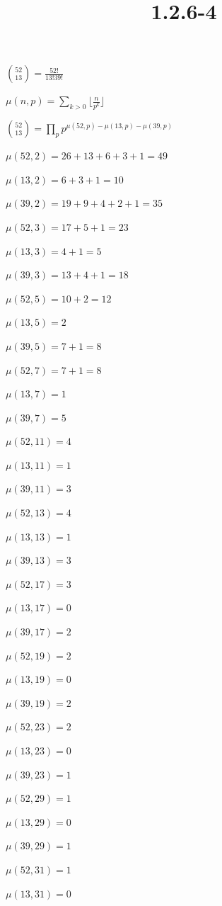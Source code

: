 \documentclass{article}
\title{1.2.6-4}
\begin{document}
\maketitle

\( \binom{52}{13} = \frac{52!}{13! 39!} \)

\( \mu(n,p) = \sum_{k > 0}{\lfloor{\frac{n}{p^k}}\rfloor} \)

\( \binom{52}{13} = \prod_p p^{\mu(52,p) - \mu(13,p) - \mu(39,p)} \)

\( \mu(52,2) = 26 + 13 + 6 + 3 + 1 = 49 \)

\( \mu(13,2) = 6 + 3 + 1 = 10 \)

\( \mu(39,2) = 19 + 9 + 4 + 2 + 1 = 35 \)

\( \mu(52,3) = 17 + 5 + 1 = 23 \)

\( \mu(13,3) = 4 + 1 = 5 \)

\( \mu(39,3) = 13 + 4 + 1 = 18 \)

\( \mu(52,5) = 10 + 2 = 12 \)

\( \mu(13,5) = 2 \)

\( \mu(39,5) = 7 + 1 = 8 \)

\( \mu(52,7) = 7 + 1 = 8 \)

\( \mu(13,7) = 1 \)

\( \mu(39,7) = 5 \)

\( \mu(52,11) = 4 \)

\( \mu(13,11) = 1 \)

\( \mu(39,11) = 3 \)

\( \mu(52,13) = 4 \)

\( \mu(13,13) = 1 \)

\( \mu(39,13) = 3 \)

\( \mu(52,17) = 3 \)

\( \mu(13,17) = 0 \)

\( \mu(39,17) = 2 \)

\( \mu(52,19) = 2 \)

\( \mu(13,19) = 0 \)

\( \mu(39,19) = 2 \)

\( \mu(52,23) = 2 \)

\( \mu(13,23) = 0 \)

\( \mu(39,23) = 1 \)

\( \mu(52,29) = 1 \)

\( \mu(13,29) = 0 \)

\( \mu(39,29) = 1 \)

\( \mu(52,31) = 1 \)

\( \mu(13,31) = 0 \)
\end{document}
